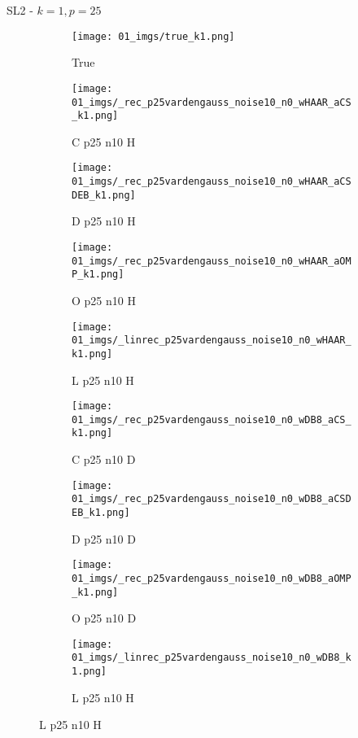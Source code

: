 \begin{frame}{SL2 - $k=1,p=25$}{}
\begin{figure}
\begin{subfigure}{0.1\textwidth}
\texttt{[image: 01\_imgs/true\_k1.png]}
\caption*{\Tiny True}
\end{subfigure}
\begin{subfigure}{0.1\textwidth}
\texttt{[image: 01\_imgs/\_rec\_p25vardengauss\_noise10\_n0\_wHAAR\_aCS\_k1.png]}
\caption*{\Tiny C p25 n10 H}
\end{subfigure}
\begin{subfigure}{0.1\textwidth}
\texttt{[image: 01\_imgs/\_rec\_p25vardengauss\_noise10\_n0\_wHAAR\_aCSDEB\_k1.png]}
\caption*{\Tiny D p25 n10 H}
\end{subfigure}
\begin{subfigure}{0.1\textwidth}
\texttt{[image: 01\_imgs/\_rec\_p25vardengauss\_noise10\_n0\_wHAAR\_aOMP\_k1.png]}
\caption*{\Tiny O p25 n10 H}
\end{subfigure}
\begin{subfigure}{0.1\textwidth}
\texttt{[image: 01\_imgs/\_linrec\_p25vardengauss\_noise10\_n0\_wHAAR\_k1.png]}
\caption*{\Tiny L p25 n10 H}
\end{subfigure}
\begin{subfigure}{0.1\textwidth}
\texttt{[image: 01\_imgs/\_rec\_p25vardengauss\_noise10\_n0\_wDB8\_aCS\_k1.png]}
\caption*{\Tiny C p25 n10 D}
\end{subfigure}
\begin{subfigure}{0.1\textwidth}
\texttt{[image: 01\_imgs/\_rec\_p25vardengauss\_noise10\_n0\_wDB8\_aCSDEB\_k1.png]}
\caption*{\Tiny D p25 n10 D}
\end{subfigure}
\begin{subfigure}{0.1\textwidth}
\texttt{[image: 01\_imgs/\_rec\_p25vardengauss\_noise10\_n0\_wDB8\_aOMP\_k1.png]}
\caption*{\Tiny O p25 n10 D}
\end{subfigure}
\begin{subfigure}{0.1\textwidth}
\texttt{[image: 01\_imgs/\_linrec\_p25vardengauss\_noise10\_n0\_wDB8\_k1.png]}
\caption*{\Tiny L p25 n10 H}
\end{subfigure}

\vspace{5pt}


\end{figure}
\end{frame}
